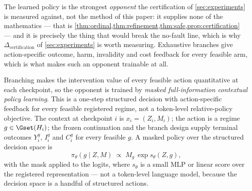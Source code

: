 The learned policy is the strongest \emph{opponent} the certification of
\cref{sec:experiments} is measured against, not the method of this paper: it
supplies none of the mathematics --- that is
\cref{thm:ordinal,thm:refinement,thm:safe,prop:certification} --- and it is
precisely the thing that would break the no-fault line, which is why
$\Delta_{\mathrm{certification}}$ of \cref{sec:experiments} is worth measuring.
Exhaustive branches give action-specific outcome, harm, invalidity and cost
feedback for every feasible arm, which is what makes such an opponent trainable
at all.

Branching makes the intervention value of every feasible action quantitative at
each checkpoint, so the opponent is trained by \emph{masked full-information
contextual policy learning}.  This is a one-step structured decision with
action-specific feedback for every feasible registered regime, not a
token-level relative-policy objective.  The context at checkpoint $i$ is
$x_i=(Z_i,M_i)$; the action is a regime $g\in\Gset(H_i)$; the frozen
continuation and the branch design supply terminal outcomes $Y^g_i$, $I^g_i$ and
$C^g_i$ for every feasible $g$.  A masked policy over the structured decision
space is
\begin{equation}
 \pi_\theta(g\mid Z,M)\;\propto\;M_{g}\,\exp s_\theta(Z,g),
 \label{eq:masked-policy}
\end{equation}
with the mask applied to the logits, where $s_\theta$ is a small MLP or linear
score over the registered representation --- not a token-level language model,
because the decision space is a handful of structured actions.


